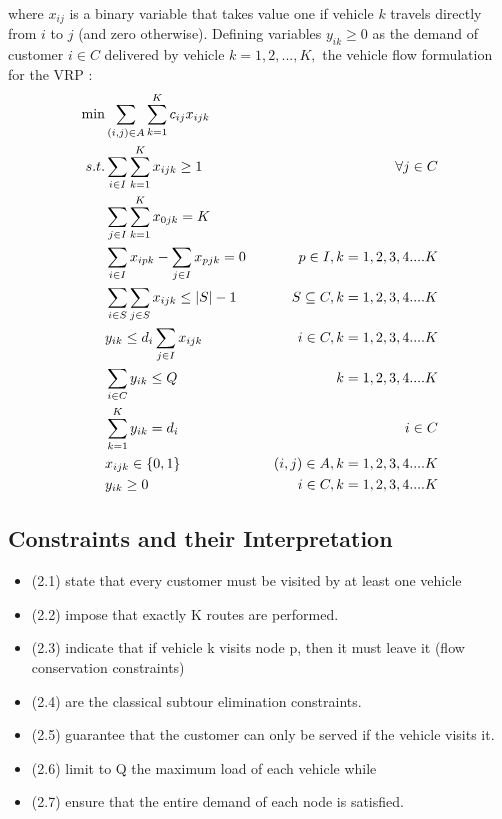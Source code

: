 \documentclass[11pt,fleqn]{book} %
\begin{document}
where $x_{ij}$ is a binary variable that takes value one if vehicle $k$ travels directly from $i$ to $j$ (and zero otherwise). Defining variables $y_{ik} \geq 0$ as the demand of customer $i \in C$ delivered by vehicle $k = 1, 2, . . . , K,$ the vehicle flow formulation for the VRP :\\


\begin{align}
\min & \sum_{(i,j) \in A} \sum\limits_{k=1}^{K} c_{ij}x_{ijk}\\
s.t.& \sum\limits_{i \in I} \sum\limits_{k=1}^{K} x_{ijk} \geq 1 && & \forall j \in C\\
& \sum\limits_{j \in I} \sum\limits_{k=1}^{K} x_{0jk} = K && \\
& \sum\limits_{i \in I}x_{ipk} - \sum\limits_{j \in I} x_{pjk} = 0 && & p \in I, k = 1,2,3,4....K\\
& \sum\limits_{i \in S} \sum\limits_{j \in S}x_{ijk} \leq |S|-1 && & S \subseteq C, k = 1,2,3,4....K\\
& y_{ik} \leq d_{i}\sum\limits_{j \in I}x_{ijk} && & \text{$i \in C, k = 1,2,3,4....K $}\\
& \sum\limits_{i \in C}y_{ik} \leq Q && & \text{$ k = 1,2,3,4....K $}\\
& \sum\limits_{k = 1}^{K}y_{ik} = d_{i} && & \text{$i \in C $}\\
& x_{ijk} \in \{0,1\}  && & \text{$(i, j) \in A, k = 1,2,3,4....K $}\\
& y_{ik} \geq 0  && & \text{$i \in C, k = 1,2,3,4....K $}
\end{align}

\newpage

\subsection{Constraints and their Interpretation} 
\begin{itemize}
\item (2.1) state that every customer must be visited by at least one
vehicle 
\item (2.2) impose that exactly K routes are performed.
\item(2.3) indicate that if vehicle k visits node p, then it must leave it (flow conservation constraints) 
\item(2.4) are the classical subtour elimination constraints.
\item(2.5) guarantee that the customer can only be served if the vehicle visits it.
\item(2.6) limit to Q the maximum load of each vehicle while
\item(2.7) ensure that the entire demand of each node is satisfied.
\end{itemize}
\end{document}
